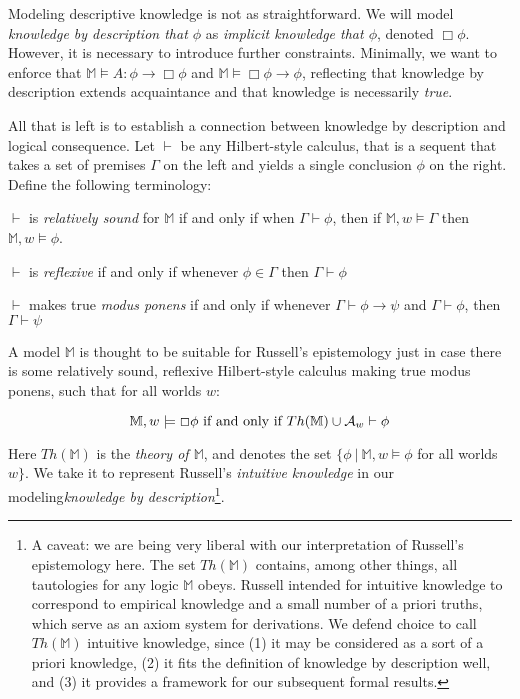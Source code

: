 Modeling descriptive knowledge is not as straightforward.  We will model
\emph{knowledge by description that $\phi$} as \emph{implicit knowledge
  that $\phi$}, denoted $\Box\phi$.  However, it is necessary to introduce
further constraints.
Minimally, we want to enforce that $\mathbb{M} \models A : \phi \to \Box \phi$ and
$\mathbb{M} \models \Box \phi \to \phi$, reflecting that knowledge by
description extends acquaintance and that knowledge is necessarily
\emph{true}.

All that is left is to establish a connection between knowledge by
description and logical
consequence.  Let $\vdash$ be any Hilbert-style calculus,
that is a sequent that takes a set of premises $\Gamma$ on the left and yields a
single conclusion $\phi$ on the right. Define the following terminology:
\begin{itemizedot}
\item $\vdash$ is \emph{relatively sound} for $\mathbb{M}$ if and only if
  when $\Gamma \vdash \phi$, then if $\mathbb{M},w\models \Gamma$ then
  $\mathbb{M},w \models \phi$.
\item $\vdash$ is \emph{reflexive} if and only if whenever $\phi \in
  \Gamma$ then $\Gamma \vdash \phi$
\item $\vdash$ makes true \emph{modus ponens} if and only if whenever
  $\Gamma \vdash \phi \to \psi$ and $\Gamma \vdash \phi$, then $\Gamma
  \vdash \psi$
\end{itemizedot}

A model $\mathbb{M}$ is thought to be suitable for Russell's epistemology just in
case there is some relatively sound,
reflexive Hilbert-style calculus making true modus ponens, such that for all
worlds $w$:

\[ \mathbb{M}, w \models \Box \phi \textup{ if and only if } Th(\mathbb{M}) \cup
\mathcal{A}_w \vdash \phi \]

Here $Th(\mathbb{M})$ is the \emph{theory of $\mathbb{M}$}, and
denotes the set $\{ \phi\ |\ \mathbb{M},w \models \phi$ for all worlds
$w \}$.  We take it to represent Russell's \emph{intuitive knowledge}
in our modeling\emph{knowledge by description}\footnote{A caveat: we are being very liberal with our interpretation
  of Russell's
  epistemology here.  The set $Th(\mathbb{M})$ contains, among other
  things, all tautologies for any logic $\mathbb{M}$ obeys.  Russell
  intended for intuitive knowledge to correspond to empirical
  knowledge and a small number of a priori truths, which serve as
  an axiom system for derivations.  We defend choice to call $Th(\mathbb{M})$ intuitive
  knowledge, since (1) it may be considered as a sort of a priori knowledge, (2) it fits the definition of knowledge by description well,
  and (3) it provides a framework for our subsequent formal results.}.
  
